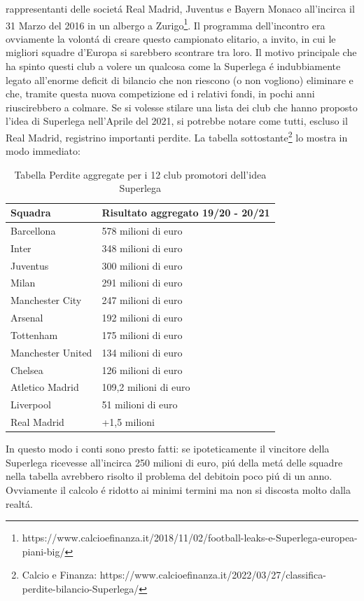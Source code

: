 \documentclass[
    corpo=12pt,
    oneside,
    evenboxes,
    tipotesi=triennale,
    stile=classica,
    oldstyle,
    autoretitolo,
    greek,
]{toptesi}
\begin{document}
\begin{interlinea}{1.5}
rappresentanti delle societ\'a Real Madrid, Juventus e Bayern Monaco all'incirca il 31 Marzo del 2016 in un albergo a Zurigo\footnote{https://www.calcioefinanza.it/2018/11/02/football-leaks-e-Superlega-europea-piani-big/}. Il programma
dell'incontro era ovviamente la volont\'a di creare questo campionato elitario, a invito, in cui le migliori squadre d'Europa si sarebbero scontrare tra loro.\newline
Il motivo principale che ha spinto questi club a volere un qualcosa come la Superlega \'e indubbiamente legato all'enorme deficit
di bilancio che non riescono (o non vogliono) eliminare e che, tramite questa nuova competizione ed i relativi fondi, in pochi anni riuscirebbero a colmare.
Se si volesse stilare una lista dei club che hanno proposto l'idea di Superlega nell'Aprile del 2021, si potrebbe notare come tutti, escluso 
il Real Madrid, registrino importanti perdite. La tabella sottostante\footnote{Calcio e Finanza: https://www.calcioefinanza.it/2022/03/27/classifica-perdite-bilancio-Superlega/} lo mostra in modo immediato:\newpage
\begin{table}
    \begin{tabularx}{\textwidth}{XX}
        \toprule
        \textbf{Squadra} & \textbf{Risultato aggregato 19/20 - 20/21} \\
        \midrule
        Barcellona & 578 milioni di euro \\
        \midrule
        Inter & 348 milioni di euro \\
        \midrule
        Juventus & 300 milioni di euro \\
        \midrule
        Milan & 291 milioni di euro \\
        \midrule
        Manchester City & 247 milioni di euro \\
        \midrule
        Arsenal & 192 milioni di euro \\
        \midrule
        Tottenham & 175 milioni di euro \\
        \midrule
        Manchester United & 134 milioni di euro \\
        \midrule
        Chelsea & 126 milioni di euro \\
        \midrule
        Atletico Madrid & 109,2 milioni di euro \\
        \midrule
        Liverpool & 51 milioni di euro \\
        \midrule
        Real Madrid & +1,5 milioni \\
        \bottomrule
    \end{tabularx}
    \caption{Tabella Perdite aggregate per i 12 club promotori dell'idea Superlega}
    \label{tabella_ris_sl}
\end{table}
In questo modo i conti sono presto fatti: se ipoteticamente il vincitore della Superlega ricevesse all'incirca 250 milioni di euro, pi\'u
della met\'a delle squadre nella tabella avrebbero risolto il problema del debitoin poco pi\'u di un anno. Ovviamente il calcolo \'e ridotto ai minimi termini ma non 
si discosta molto dalla realt\'a.

\end{interlinea}
\end{document}
